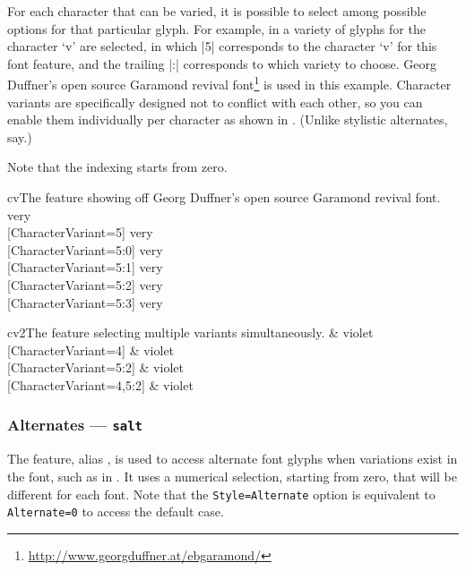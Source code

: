 \documentclass[a4paper]{l3doc}
\begin{document}
For each character that can be varied, it is possible to select among
possible options for that particular glyph.
For example, in  a variety of glyphs for the character `v' are
selected, in which |5| corresponds to the character `v' for this font feature,
and the trailing |:| corresponds to which variety to choose.
Georg Duffner's open source Garamond revival font\footnote{\url{http://www.georgduffner.at/ebgaramond/}} is used in this example.
Character variants are specifically designed not to conflict with each
other, so you can enable them individually per character as shown in
. (Unlike stylistic alternates, say.)

Note that the indexing starts from zero.

\begin{Lexample}[firstline=2]{cv}{The  feature showing off Georg Duffner's open source Garamond revival font.}
  \huge
                         very \\
  [CharacterVariant=5]   very \\
  [CharacterVariant=5:0] very \\
  [CharacterVariant=5:1] very \\
  [CharacterVariant=5:2] very \\
  [CharacterVariant=5:3] very
\end{Lexample}

\begin{Lexample}[firstline=2]{cv2}{The  feature selecting multiple variants simultaneously.}
  \huge
                             \& violet \\
  [CharacterVariant={4}]     \& violet \\
  [CharacterVariant={5:2}]   \& violet \\
  [CharacterVariant={4,5:2}] \& violet
\end{Lexample}

\subsubsection{Alternates --- \texttt{salt}}

The  feature, alias , is used to access alternate font glyphs when variations exist in the font, such as in .
It uses a numerical selection, starting from zero, that will be different for each font.
Note that the \texttt{Style=Alternate} option is equivalent
to \texttt{Alternate=0} to access the default case.
\end{document}
